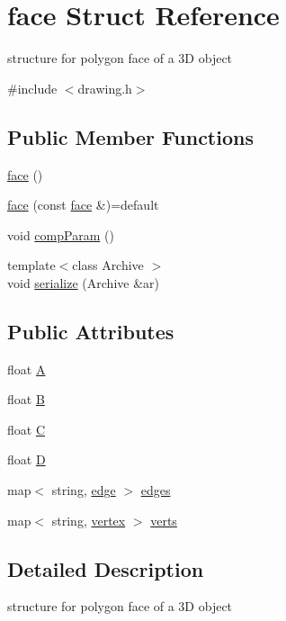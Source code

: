 \hypertarget{structface}{}\section{face Struct Reference}
\label{structface}


structure for polygon face of a 3D object  




{\ttfamily \#include $<$drawing.\+h$>$}

\subsection*{Public Member Functions}
\begin{DoxyCompactItemize}
\item 
\hyperlink{structface_aedd4a569b889e3100409db561c33b259}{face} ()
\item 
\hyperlink{structface_aa1dc835c3d2336032538ef2576edfcc4}{face} (const \hyperlink{structface}{face} \&)=default
\item 
void \hyperlink{structface_a9824194eb850dd3b7495b959075e2e01}{comp\+Param} ()
\item 
{\footnotesize template$<$class Archive $>$ }\\void \hyperlink{structface_a3ffb6e9cb1b3b04be1abd66ecace8c79}{serialize} (Archive \&ar)
\end{DoxyCompactItemize}
\subsection*{Public Attributes}
\begin{DoxyCompactItemize}
\item 
float \hyperlink{structface_a1091483a325e1f823c3723b9dad942eb}{A}
\item 
float \hyperlink{structface_a70317a6c8d81b4ee406025aadf7f9487}{B}
\item 
float \hyperlink{structface_af381ff59cc598f4e6d31a008dee13284}{C}
\item 
float \hyperlink{structface_afaa376f0d0dabf12a9832165bd5f00ab}{D}
\item 
map$<$ string, \hyperlink{structedge}{edge} $>$ \hyperlink{structface_ac8a0c9860a641b73d3bbcdf18e18df14}{edges}
\item 
map$<$ string, \hyperlink{structvertex}{vertex} $>$ \hyperlink{structface_a44e0350b6d4ce9dc74b611944e40fbbf}{verts}
\end{DoxyCompactItemize}


\subsection{Detailed Description}
structure for polygon face of a 3D object 

